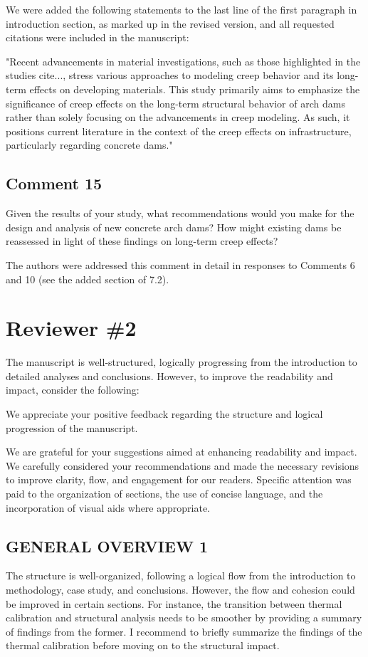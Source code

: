 \documentclass{ar2rc}
\begin{document}
	\AR We were added the following statements to the last line of the first paragraph in introduction section, as marked up in the revised version, and all requested citations were included in the manuscript:

	"Recent advancements in material investigations, such as those highlighted in the studies cite{...}, stress various approaches to modeling creep behavior and its long-term effects on developing materials. This study primarily aims to emphasize the significance of creep effects on the long-term structural behavior of arch dams rather than solely focusing on the advancements in creep modeling. As such, it positions current literature in the context of the creep effects on infrastructure, particularly regarding concrete dams."	
	
	\subsection{Comment 15}
	\RC	Given the results of your study, what recommendations would you make for the design and analysis of new concrete	arch dams? How might existing dams be reassessed in light of these findings on long-term creep effects?
	
	\AR The authors were addressed this comment in detail in responses to Comments 6 and 10 (see the added section of 7.2).
	
	
	\newpage
	\section{Reviewer \#2}
	\RC The manuscript is well-structured, logically progressing from the introduction to detailed analyses and conclusions. However, to improve the readability and impact, consider the following:
	
	\AR We appreciate your positive feedback regarding the structure and logical progression of the manuscript.
	
	We are grateful for your suggestions aimed at enhancing readability and impact. We carefully considered your recommendations and made the necessary revisions to improve clarity, flow, and engagement for our readers. Specific attention was paid to the organization of sections, the use of concise language, and the incorporation of visual aids where appropriate.
	
	\subsection{GENERAL OVERVIEW 1}
	\RC	The structure is well-organized, following a logical flow from the introduction to methodology, case study, and conclusions. However, the flow and cohesion could be improved in certain sections. For instance, the transition between thermal calibration and structural analysis needs to be smoother by providing a summary of findings from the former. I recommend
	to briefly summarize the findings of the thermal calibration before moving on to the structural impact.
	
\end{document}
